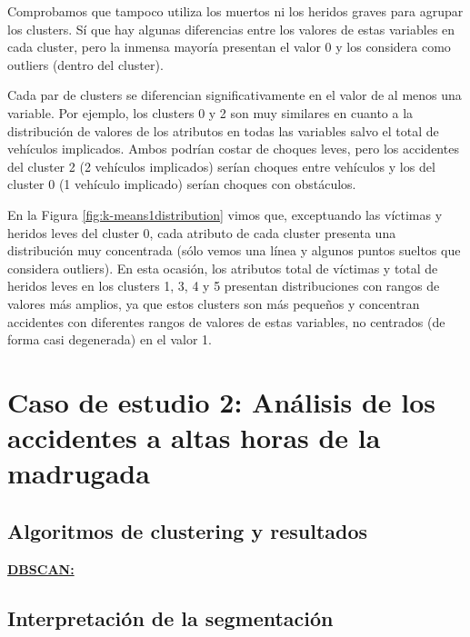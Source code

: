 \documentclass[oneside]{book}
\begin{document}
Comprobamos que tampoco utiliza los muertos ni los heridos graves para
agrupar los clusters. Sí que hay algunas diferencias entre los valores
de estas variables en cada cluster, pero la inmensa mayoría presentan
el valor 0 y los considera como outliers (dentro del cluster).

Cada par de clusters se diferencian significativamente en el valor de
al menos una variable. Por ejemplo, los clusters 0 y 2 son muy
similares en cuanto a la distribución de valores de los atributos en
todas las variables salvo el total de vehículos implicados. Ambos
podrían costar de choques leves, pero los accidentes del cluster 2 (2
vehículos implicados) serían choques entre vehículos y los del cluster
0 (1 vehículo implicado) serían choques con obstáculos.

En la Figura \ref{fig:k-means1distribution} vimos que, exceptuando las
víctimas y heridos leves del cluster 0, cada atributo de cada cluster
presenta una distribución muy concentrada (sólo vemos una línea y
algunos puntos sueltos que considera outliers). En esta ocasión, los
atributos total de víctimas y total de heridos leves en los clusters
1, 3, 4 y 5 presentan distribuciones con rangos de valores más
amplios, ya que estos clusters son más pequeños y concentran
accidentes con diferentes rangos de valores de estas variables, no
centrados (de forma casi degenerada) en el valor 1. 

\section{Caso de estudio 2: Análisis de los accidentes a altas horas de la madrugada}

\subsection{Algoritmos de clustering y resultados}

\href{https://scikit-learn.org/stable/modules/generated/sklearn.cluster.DBSCAN.html}{\textbf{DBSCAN:}}

\subsection{Interpretación de la segmentación}
\end{document}
